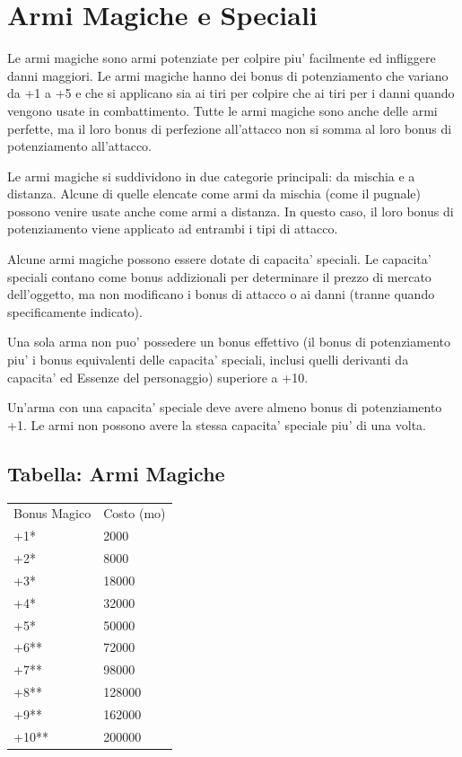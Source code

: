 \documentclass[a4paper,11pt,twoside,openany]{dndbook}
\begin{document}
{\pagebreak

\section{Armi Magiche e Speciali}

\label{armi-magiche-e-speciali}

Le armi magiche sono armi potenziate per colpire piu' facilmente ed infliggere danni maggiori. Le armi magiche hanno dei bonus di potenziamento che variano da +1 a +5 e che si applicano sia ai tiri per colpire che ai tiri per i danni quando vengono usate in combattimento. Tutte le armi magiche sono anche delle armi perfette, ma il loro bonus di perfezione all'attacco non si somma al loro bonus di potenziamento all'attacco.

Le armi magiche si suddividono in due categorie principali: da mischia e a distanza. Alcune di quelle elencate come armi da mischia (come il pugnale) possono venire usate anche come armi a distanza. In questo caso, il loro bonus di potenziamento viene applicato ad entrambi i tipi di attacco.

Alcune armi magiche possono essere dotate di capacita' speciali. Le capacita' speciali contano come bonus addizionali per determinare il prezzo di mercato dell'oggetto, ma non modificano i bonus di attacco o ai danni (tranne quando specificamente indicato).

Una sola arma non puo' possedere un bonus effettivo (il bonus di potenziamento piu' i bonus equivalenti delle capacita' speciali, inclusi quelli derivanti da capacita' ed Essenze del personaggio) superiore a +10. 

Un'arma con una capacita' speciale deve avere almeno bonus di potenziamento +1. Le armi non possono avere la stessa capacita' speciale piu' di una volta.



\subsection{Tabella: Armi Magiche}

\label{tabella-armi-magiche}

\begin{tabular}[c]{@{}ll@{}}
\toprule 
Bonus Magico & Costo (mo)\tabularnewline
+1{*} & 2000\tabularnewline
+2{*} & 8000\tabularnewline
+3{*} & 18000\tabularnewline
+4{*} & 32000\tabularnewline
+5{*} & 50000\tabularnewline
+6{*}{*} & 72000\tabularnewline
+7{*}{*} & 98000\tabularnewline
+8{*}{*} & 128000\tabularnewline
+9{*}{*} & 162000\tabularnewline
+10{*}{*} & 200000\tabularnewline
\bottomrule
\end{tabular}

}
\end{document}
